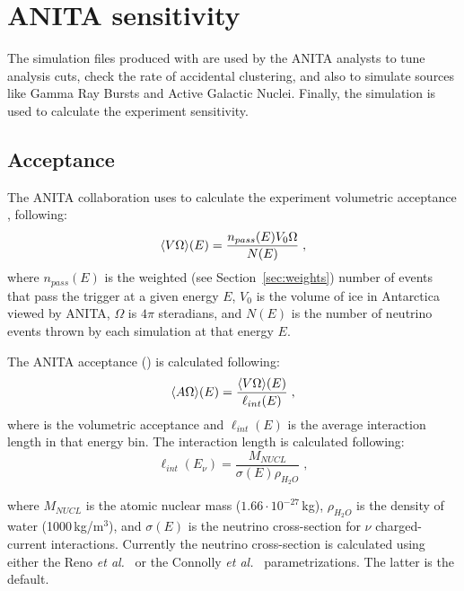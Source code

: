\section{ANITA sensitivity}
\label{sec:results}

The simulation files produced with \icemc are used by the ANITA analysts to tune analysis cuts, check the rate of accidental clustering, and also to simulate sources like Gamma Ray Bursts and Active Galactic Nuclei.
Finally, the simulation is used to calculate the experiment sensitivity.

\subsection{Acceptance}
\label{subsec:acceptance}
The ANITA collaboration uses \icemc to calculate the experiment volumetric acceptance \effvol, following:
\begin{equation}
  \label{eq:volacceptance}
  \langle V\Omega\rangle(E) = \dfrac{n_{{pass}}(E)V_0\Omega}{N(E)} \;,
\end{equation}
\noindent where
 $n_{{pass}}(E)$ is the weighted (see Section~\ref{sec:weights}) number of events that pass the trigger at a given energy $E$,
 $V_0$ is the volume of ice in Antarctica viewed by ANITA,
$\Omega$ is $4\pi$ steradians, and 
 $N(E)$ is the number of neutrino events thrown by each simulation at that energy $E$.

The ANITA acceptance (\effarea) is calculated following:
\begin{equation}
  \label{eq:acceptance}
  \langle A\Omega\rangle(E) = \dfrac{\langle V\Omega\rangle(E)}{\ell_{{int}}(E)} \;,
\end{equation}
\noindent where
 \effvol is the volumetric acceptance and
 $\ell_{{int}}(E)$ is the average interaction length in that energy bin. 
The interaction length is calculated following:
 \begin{equation}
   \label{eq:intlength}
    \ell_{{int}}(E_\nu) =   \dfrac{M_{NUCL}}{\sigma(E) \rho_{H_2O} } \;,
  \end{equation}
  
\noindent where
 $M_{NUCL}$ is the atomic nuclear mass ($1.66\cdot 10^{-27}$\,kg),
 $\rho_{H_2O}$ is the density of water (1000\,kg/m$^3$), 
and $\sigma(E)$ is the neutrino cross-section for $\nu$ charged-current interactions.
Currently the neutrino cross-section is calculated using either the
Reno {\it et al.}~\cite{reno2005high}
or the Connolly {\it et al.}~\cite{PhysRevD.83.113009} parametrizations.
The latter is the default.

